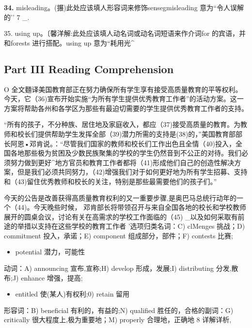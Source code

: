 \documentclass[UTF8,11pt]{ctexart}
\begin{document}
\textbf{34.} misleading。(搌)此处应该填人形容词来修饰sensegmisleading 意为“令人误解的’’ 7 \_.


35. using up。〔馨洋解:此处应该填人动名词或动名词短语来作介词for 的宾语，并和forests 进行搭配。using up 意为“耗用光\textasciicircum{}


\subsection*{Part III Reading Comprehension}


O 全文麵译美国教育部正在努力确保所有学生享有接受高质量教育的平等权利。今天，它（36)宣布开始实施“为所有学生提供优秀教育工作者”的活动方案。这一方案将帮助各州和各学区为那些有最迫切需要的学生提供优秀教育工作者的支持。


“所有的孩子，不分种族、居住地及家庭收入，都应（37)接受高质量的教育。为教师和校长们提供帮助学生发挥全部（39)潜力所需的支持是(38)的，”美国教育部部长阿恩•邓肯说。：“尽管我们国家的教师和校长们工作出色且全情（40)投入，全国各地那些极为贫困及少数民族聚集的学校的学生仍然音到不公正的对待。我们必须努力做到更好\textasciicircum{}地方官员和教育工作者都将（41)形成他们自己的创造性解决方案，但是我们必须共同努力，（42)增强我们对于如何更好地为所有学生招募、支持和（43)留住优秀教师和校长的关注，特别是那些最需要他们的孩子们。”


今天的公告是改善获得高质量教育权利的又一重要步骤,是奥巴马总统行动年的一个（44)。今天晚些时候， 邓肯部长将带领召开与来自全国各地的校长和学校教师展开的圆桌会议，讨论有关在高需求的学校工作面临的（45) \_以及如何采取有前途的举措以支持在这些学校的教育工作者 '选项归类名词：C) clMenges 挑战；D) commitment 投入，承诺；E) component 组成部分，部件；F) contests 比赛;


\begin{itemize}[leftmargin=2em,itemsep=.2em,topsep=.4em]\item[L.] potential 潜力，可能性
\end{itemize}

动词：A) announcing 宣布,宣称;H) develop 形成，发展;I) distributing 分发,散布;J) enhance 增强，提高;


\begin{itemize}[leftmargin=2em,itemsep=.2em,topsep=.4em]\item[K.] entitled 使(某人)有权利;0) retain 留用
\end{itemize}

形容词：B) beneficial 有利的，有益的;N) qualified 胜任的，合格的副词：G) critically 很大程度上,极为重要地；M) properly 合理地，正确地 8 详解详析,
\end{document}
